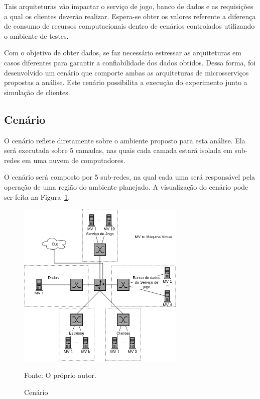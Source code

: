 Tais arquiteturas vão impactar o serviço de jogo, banco de dados e as requisições a qual os clientes deverão realizar.
%
Espera-se obter os valores referente a diferença de consumo de recursos computacionais dentro de cenários controlados utilizando o ambiente de testes.



Com o objetivo de obter dados, se faz necessário estressar as arquiteturas em casos diferentes para garantir a confiabilidade dos dados obtidos.
%
Dessa forma, foi desenvolvido um cenário que comporte ambas as arquiteturas de microsserviços propostas a análise.
%
Este cenário possibilita a execução do experimento junto a simulação de clientes.



\subsection{Cenário}



O cenário reflete diretamente sobre o ambiente proposto para esta análise.
%
Ela será executada sobre 5 camadas, nas quais cada camada estará isolada em sub-redes em uma nuvem de computadores.

O cenário será composto por 5 sub-redes, na qual cada uma será responsável pela operação de uma região do ambiente planejado.
%
A visualização do cenário pode ser feita na Figura~\ref{fig:cenario}.

\begin{figure}[htb!]
  \caption{Cenário}
  \label{fig:cenario}
  \includegraphics[height=8cm]{img/cap3/cenario.png}
  \centering

  Fonte: O próprio autor.
\end{figure}

